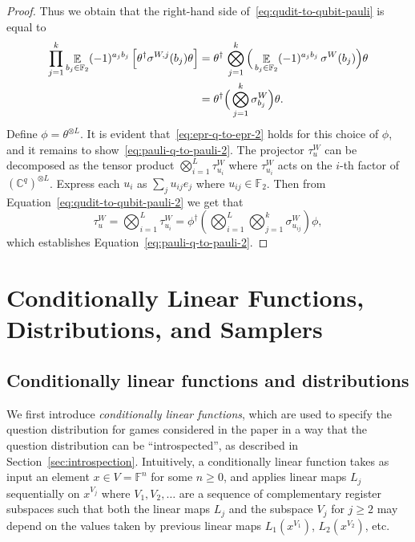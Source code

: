 \documentclass[11pt]{article}
\theoremstyle{definition}
\newcommand{\C}{\ensuremath{\mathbb{C}}}
\newcommand{\F}{\ensuremath{\mathbb{F}}}
\newcommand{\E}{\mathop{\mathbb{E}}\displaylimits}
\begin{document}
\begin{proof}
  Thus we obtain that the right-hand side of~\eqref{eq:qudit-to-qubit-pauli} is
  equal to
  \begin{align}
		\prod_{j=1}^k \E_{b_j \in \F_2} (-1)^{a_j b_j} \,
    \Big [ \theta^\dagger \sigma^{W,j}(b_j) \theta \Big ]
    & = \theta^\dagger \, \bigotimes_{j=1}^k
      \Big ( \E_{b_j \in \F_2} (-1)^{a_j b_j} \, \sigma^{W}(b_j) \Big) \theta \\
		& = \theta^\dagger \Big (\bigotimes_{j=1}^k \sigma^W_{b_j} \Big) \theta.
		\label{eq:qudit-to-qubit-pauli-2}
  \end{align}
  Define $\phi = \theta^{\otimes L}$. It is evident
  that~\eqref{eq:epr-q-to-epr-2} holds for this choice of $\phi$, and
  it remains to show~\eqref{eq:pauli-q-to-pauli-2}. The projector $\tau^W_u$ can be
  decomposed as the tensor product $\bigotimes_{i=1}^L \tau^{W}_{u_i}$
  where $\tau^{W}_{u_i}$ acts on the $i$-th factor of $(\C^q)^{\otimes L}$.
  Express each $u_i$ as $\sum_j u_{ij} e_j$ where $u_{ij} \in \F_2$. Then from
  Equation~\eqref{eq:qudit-to-qubit-pauli-2} we get that
  \begin{equation}
  	\tau^W_u = \bigotimes_{i=1}^L \tau^W_{u_i}
    = \phi^\dagger \left( \bigotimes_{i=1}^L
      \bigotimes_{j=1}^k \sigma^W_{u_{ij}} \right) \phi,
  \end{equation}
  which establishes Equation~\eqref{eq:pauli-q-to-pauli-2}. 
\end{proof}


 
\section{Conditionally Linear Functions, Distributions, and Samplers}
\label{sec:linear}

\subsection{Conditionally linear functions and distributions}
\label{sec:cl}

We first introduce \emph{conditionally linear functions}, which are used to
specify the question distribution for games considered in the paper in a way
that the question distribution can be ``introspected'', as described in
Section~\ref{sec:introspection}.
Intuitively, a conditionally linear function takes as input an element
$x\in V = \F^n$ for some $n\geq 0$, and applies linear maps $L_j$ sequentially
on $x^{V_j}$ where $V_1,V_2,\ldots $ are a sequence of complementary register
subspaces such that both the linear maps $L_j$ and the subspace $V_j$ for
$j \ge 2$ may depend on the values taken by previous linear maps $L_1(x^{V_1})$,
$L_2(x^{V_2})$, etc.
\end{document}
